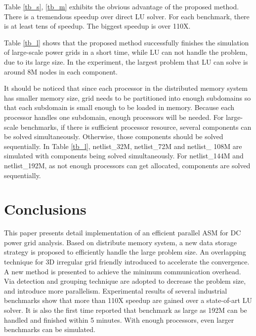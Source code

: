 \documentclass{sig-alternate}
\begin{document}
	Table \ref{tb_s}, \ref{tb_m} exhibits the obvious advantage of the proposed method. There is a tremendous 
	speedup over direct LU solver. For each benchmark, there is at least tens of speedup. The biggest speedup is over 110X. 

	Table \ref{tb_l} shows that the proposed method successfully finishes the simulation of large-scale power grids
	in a short time, while LU can not handle the problem, due to its large size. In the experiment, the largest problem that LU 
	can solve is around 8M nodes in each component. 

	It should be noticed that since each processor in the distributed memory system has smaller memory size, grid needs to be 
	partitioned into enough subdomains so that each subdomain is small enough to be loaded in memory. Because each processor handles 
	one 
	subdomain, enough processors will be needed. For large-scale benchmarks, if there is sufficient processor resource, several 
	components can be solved simultaneously. Otherwise, those components should be 
	solved sequentially. In Table \ref{tb_l}, netlist\_32M, netlist\_72M and netlist\_
	108M are 
	simulated with components being solved simultaneously. For netlist\_144M and 
	netlist\_192M, as not enough processors can get allocated, components are solved sequentially.

\section{Conclusions}
	This paper presents detail implementation of an efficient parallel ASM for DC power grid analysis. Based on distribute memory 
	system, a new data storage strategy is proposed to efficiently handle the large problem size. An overlapping technique for 3D 
	irregular grid friendly introduced to accelerate the convergence. A new method is presented to achieve the minimum communication overhead. Via 
	detection and grouping technique are adopted to decrease the problem size, and introduce more parallelism. Experimental 
	results of several industrial benchmarks show that more than 110X speedup are gained over a state-of-art LU solver. It is also 
	the first time reported that benchmark as large as 192M can be handled and finished within 5 minutes. With enough processors, 
	even larger benchmarks can be simulated.



\end{document}
